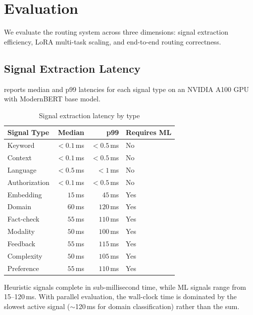 
\section{Evaluation}
\label{sec:evaluation}

We evaluate the routing system across three dimensions: signal extraction efficiency, LoRA multi-task scaling, and end-to-end routing correctness.

\subsection{Signal Extraction Latency}

 reports median and p99 latencies for each signal type on an NVIDIA A100 GPU with ModernBERT base model.

\begin{table}[h]
\centering
\caption{Signal extraction latency by type}
\label{tab:signal_latency}
\begin{tabular}{lrrl}
\toprule
\textbf{Signal Type} & \textbf{Median} & \textbf{p99} & \textbf{Requires ML} \\
\midrule
Keyword      & $< 0.1$\,ms & $< 0.5$\,ms  & No \\
Context      & $< 0.1$\,ms & $< 0.5$\,ms  & No \\
Language     & $< 0.5$\,ms & $< 1$\,ms    & No \\
Authorization & $< 0.1$\,ms & $< 0.5$\,ms & No \\
\midrule
Embedding    & $15$\,ms    & $45$\,ms     & Yes \\
Domain       & $60$\,ms    & $120$\,ms    & Yes \\
Fact-check   & $55$\,ms    & $110$\,ms    & Yes \\
Modality     & $50$\,ms    & $100$\,ms    & Yes \\
Feedback     & $55$\,ms    & $115$\,ms    & Yes \\
Complexity   & $50$\,ms    & $105$\,ms    & Yes \\
Preference   & $55$\,ms    & $110$\,ms    & Yes \\
\bottomrule
\end{tabular}
\end{table}

Heuristic signals complete in sub-millisecond time, while ML signals range from 15--120\,ms.
With parallel evaluation, the wall-clock time is dominated by the slowest active signal ($\sim$120\,ms for domain classification) rather than the sum.

